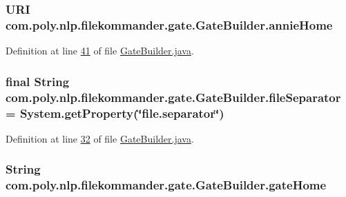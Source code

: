 \hypertarget{classcom_1_1poly_1_1nlp_1_1filekommander_1_1gate_1_1_gate_builder_a4f34ff5f89a6a8a2ddcc72935cb6f51d}{
\subsubsection[{annie\-Home}]{\setlength{\rightskip}{0pt plus 5cm}U\-R\-I com.\-poly.\-nlp.\-filekommander.\-gate.\-Gate\-Builder.\-annie\-Home\hspace{0.3cm}{\ttfamily [private]}}}\label{classcom_1_1poly_1_1nlp_1_1filekommander_1_1gate_1_1_gate_builder_a4f34ff5f89a6a8a2ddcc72935cb6f51d}


Definition at line \hyperlink{L41}{41} of file \hyperlink{}{Gate\-Builder.\-java}.

\hypertarget{classcom_1_1poly_1_1nlp_1_1filekommander_1_1gate_1_1_gate_builder_aca691fb8ad715fd61ccf5845647c7bf2}{
\subsubsection[{file\-Separator}]{\setlength{\rightskip}{0pt plus 5cm}final String com.\-poly.\-nlp.\-filekommander.\-gate.\-Gate\-Builder.\-file\-Separator = System.\-get\-Property(\char`\"{}file.\-separator\char`\"{})\hspace{0.3cm}{\ttfamily [private]}}}\label{classcom_1_1poly_1_1nlp_1_1filekommander_1_1gate_1_1_gate_builder_aca691fb8ad715fd61ccf5845647c7bf2}


Definition at line \hyperlink{L32}{32} of file \hyperlink{}{Gate\-Builder.\-java}.

\hypertarget{classcom_1_1poly_1_1nlp_1_1filekommander_1_1gate_1_1_gate_builder_abdefcfc6edae8b7edf26f0381ed9da34}{
\subsubsection[{gate\-Home}]{\setlength{\rightskip}{0pt plus 5cm}String com.\-poly.\-nlp.\-filekommander.\-gate.\-Gate\-Builder.\-gate\-Home\hspace{0.3cm}{\ttfamily [private]}}}\label{classcom_1_1poly_1_1nlp_1_1filekommander_1_1gate_1_1_gate_builder_abdefcfc6edae8b7edf26f0381ed9da34}


